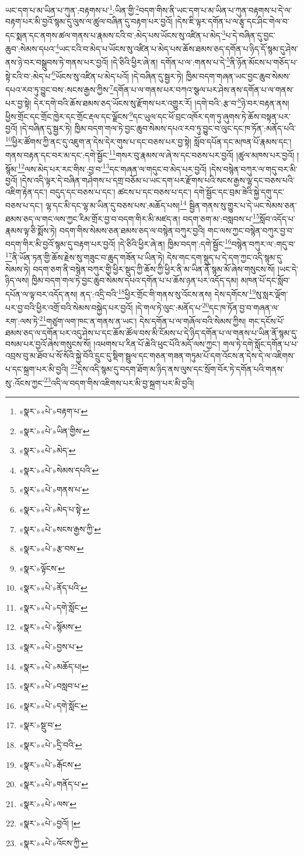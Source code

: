 ཡང་དག་པ་མ་ཡིན་པ་ཀུན་:བརྟགས་པ་\footnote{«སྣར་»«པེ་»བརྟག་པ་}:ཡིན་གྱི་\footnote{«སྣར་»«པེ་»ཡིན་གྱིས་}བདག་གིས་ནི་ཡང་དག་པ་མ་ཡིན་པ་ཀུན་བརྟགས་པ་དེ་ལ་བརྟག་པར་མི་བྱའོ་སྙམ་དུ་ལུས་ལ་ཚུལ་བཞིན་དུ་བརྟག་པར་བྱའོ། །དེས་ཇི་ལྟར་དགོན་པ་ལ་རྩྭ་དང་ཤིང་གེལ་བ་དང་སྨན་དང་ནགས་ཚལ་གནས་པ་རྣམས་ངའི་བ་:མེད་པས་ཡོངས་སུ་འཛིན་པ་མེད་\footnote{«སྣར་»«པེ་»མེད་}པ་དེ་བཞིན་དུ་བྱང་ཆུབ་:སེམས་དཔའ་\footnote{«སྣར་»«པེ་»སེམས་དཔའི་}ཡང་ངའི་བ་མེད་པ་ཡོངས་སུ་འཛིན་པ་མེད་པས་ཆོས་ཐམས་ཅད་དགོན་པ་ཉིད་དོ་སྙམ་དུ་ཤེས་ནས་ཉེ་བར་བསྒྲུབས་ཏེ་གནས་པར་བྱའོ། །དེ་ཅིའི་ཕྱིར་ཞེ་ན། དགོན་པ་ལ་:གནས་པ་དེ་\footnote{«སྣར་»«པེ་»གནས་པ་}ནི་ཉོན་མོངས་པ་གཅོད་པ་སྟེ་ངའི་བ་:མེད་པ་\footnote{«སྣར་»«པེ་»མེད་པ་སྟེ་}ཡོངས་སུ་འཛིན་པ་མེད་པའོ། །དེ་བཞིན་དུ་སྦྱར་ཏེ། ཁྱིམ་བདག་གཞན་ཡང་བྱང་ཆུབ་སེམས་དཔའ་རབ་ཏུ་བྱུང་བས་:སངས་རྒྱས་ཀྱིས་\footnote{«སྣར་»«པེ་»སངས་རྒྱས་ཀྱི་}དགོན་པ་ལ་གནས་པར་བཀའ་སྩལ་པར་ཤེས་ནས་དགོན་པ་ལ་གནས་པར་བྱ་སྟེ། དེར་དགེ་བའི་ཆོས་ཐམས་ཅད་ཡོངས་སུ་རྫོགས་པར་འགྱུར་རོ། །དགེ་བའི་:རྩ་བ་\footnote{«སྣར་»«པེ་»རྩ་བས་}ཉེ་བར་བརྟན་ནས། ཕྱིས་གྲོང་དང་གྲོང་ཁྱེར་དང་གྲོང་རྡལ་དང་ལྗོངས་\footnote{«སྣར་»ལྟོངས་}དང་ཡུལ་དང་ཕོ་བྲང་འཁོར་དག་ཏུ་ཞུགས་ཏེ་ཆོས་བསྟན་པར་བྱའོ། །དེ་བཞིན་དུ་སྦྱར་ཏེ། ཁྱིམ་བདག་གལ་ཏེ་བྱང་ཆུབ་སེམས་དཔའ་རབ་ཏུ་བྱུང་བ་ལུང་དང་ཁ་ཏོན་:མནོད་པའི་\footnote{«སྣར་»«པེ་»ནོད་པའི་}ཕྱིར་ཚོགས་ཀྱི་ནང་དུ་འཇུག་ན་དེས་དེར་གུས་པ་དང་བཅས་པར་བྱ་སྟེ། སློབ་དཔོན་དང་མཁན་པོ་རྣམས་དང་། གནས་བརྟན་དང་བར་མ་དང་:དགེ་སྦྱོང་\footnote{«སྣར་»«པེ་»དགེ་སློང་}གསར་བུ་རྣམས་ལ་ཞེ་ས་དང་བཅས་པར་བྱའོ། །ཚུལ་མཁས་པར་བྱའོ། །སྙོམ་\footnote{«སྣར་»«པེ་»སྙོམས་}ལས་མེད་པར་རང་གིས་:བྱ་བ་\footnote{«སྣར་»«པེ་»བྱས་པ་}དང་གཞན་ལ་གདུང་བ་མེད་པར་བྱའོ། །དེས་བསྙེན་བཀུར་ལ་གདུ་བར་མི་བྱའོ། །དེས་འདི་ལྟར་དེ་བཞིན་གཤེགས་པ་དགྲ་བཅོམ་པ་ཡང་དག་པར་རྫོགས་པའི་སངས་རྒྱས་ལྷ་དང་བཅས་པའི་འཇིག་རྟེན་དང་། བདུད་དང་བཅས་པ་དང་། ཚངས་པ་དང་བཅས་པ་དང་། དགེ་སྦྱོང་དང་བྲམ་ཟེའི་སྐྱེ་དགུ་དང་བཅས་པ་དང་། ལྷ་དང་མི་དང་ལྷ་མ་ཡིན་དུ་བཅས་པས་:མཆོད་པས།\footnote{«སྣར་»«པེ་»མཆོད་པ།} སྦྱིན་གནས་སུ་གྱུར་པ་དེ་ཡང་སེམས་ཅན་ཐམས་ཅད་ལ་གང་ལས་ཀྱང་རིམ་གྲོར་བྱ་བ་བདག་གིར་མི་མཛད་ན། བདག་ཅག་མ་:བསླབས་པ་\footnote{«སྣར་»«པེ་»བསླབ་པ་}སློབ་འདོད་པ་རྣམས་ལྟ་ཅི་སྨོས་ཏེ། བདག་གིས་སེམས་ཅན་ཐམས་ཅད་ལ་བསྙེན་བཀུར་བྱའི། གང་ལས་ཀྱང་བསྙེན་བཀུར་བྱ་བ་བདག་གིར་མི་བྱའོ་སྙམ་དུ་བརྟག་པར་བྱའོ། །དེ་ཅིའི་ཕྱིར་ཞེ་ན། ཁྱིམ་བདག་:དགེ་སྦྱོང་\footnote{«སྣར་»«པེ་»དགེ་སློང་}བསྙེན་བཀུར་ལ་:གདུ་བ་\footnote{«སྣར་»སྡུ་བ་}ནི་ཡོན་ཏན་གྱི་ཆོས་རྗེས་སུ་གཟུང་བ་ཆུད་གཟོན་པ་ཡིན་ཏེ། དེས་གང་དག་སྡུད་པ་དེ་དག་ཀྱང་འདི་སྙམ་དུ་སེམས་ཏེ། བདག་ཅག་ནི་བསྙེན་བཀུར་གྱི་ཕྱིར་སྡུད་ཀྱི་ཆོས་ཀྱི་ཕྱིར་ནི་མ་ཡིན་ནོ་སྙམ་མོ་ཞེས་གསུངས་སོ། །ཡང་དེ་ཉིད་ལས། ཁྱིམ་བདག་གལ་ཏེ་བྱང་ཆུབ་སེམས་དཔའ་དགོན་པ་པ་ཆོས་ཉན་པར་འདོད་དམ། མཁན་པོ་དང་སློབ་དཔོན་ལ་ལྟ་བར་འདོད་ནས། ནད་:འདྲི་བའི་\footnote{«སྣར་»«པེ་»དྲི་བའི་}ཕྱིར་གྲོང་གི་གནས་སུ་འོངས་ནས། དེས་དགོངས་\footnote{«སྣར་»«པེ་»རྒོངས་}སུ་སླར་ལྡོག་པར་བྱ་བའི་ཕྱིར་འགྲོ་བའི་སེམས་བསྐྱེད་པར་བྱའོ། །དེ་གལ་ཏེ་ལུང་:མནོད་པ་\footnote{«སྣར་»«པེ་»གནོད་པ་}དང་ཁ་ཏོན་བྱ་བ་གཞན་ལ་རག་:ལས་ཏེ་\footnote{«སྣར་»«པེ་»ལས་}གཙུག་ལག་ཁང་ན་གནས་ན་ཡང་། དེས་དགོན་པ་ལ་གཞོལ་བའི་སེམས་ཀྱིས། གང་དངོས་པོ་ཐམས་ཅད་ལ་དགོན་པར་འདུ་ཤེས་པ་དང་ཆོས་ཚོལ་བས་མི་ངོམས་པ་དེ་ཉིད་དགོན་པ་ལ་གནས་པ་ཡིན་ནོ་སྙམ་དུ་བསམ་པར་བྱའོ་ཞེས་གསུངས་སོ། །འཕགས་པ་རིན་པོ་ཆེའི་ཕུང་པོའི་མདོ་ལས་ཀྱང་། གལ་ཏེ་དགེ་སློང་དགོན་པ་པ་འབྲས་བུ་མ་ཐོབ་པ་སོ་སོའི་སྐྱེ་བོའི་དྲུང་དུ་སྡིག་སྦྲུལ་དང་གཅན་གཟན་གཏུམ་པོ་དག་འོངས་ན་དེས་དེ་ལ་འཇིགས་པ་དང་སྐྲག་པར་མི་བྱའི། \footnote{«སྣར་»«པེ་»བྱའོ། ། }དེས་འདི་སྙམ་དུ་བདག་ཐོག་མ་ཉིད་ནས་ལུས་དང་སྲོག་བོར་ཏེ་དགོན་པའི་གནས་སུ་:འོངས་ཀྱང་\footnote{«སྣར་»«པེ་»འོངས་ཀྱི་}འདི་ལ་བདག་གིས་འཇིགས་པར་མི་བྱ་སྐྲག་པར་མི་བྱའི། 